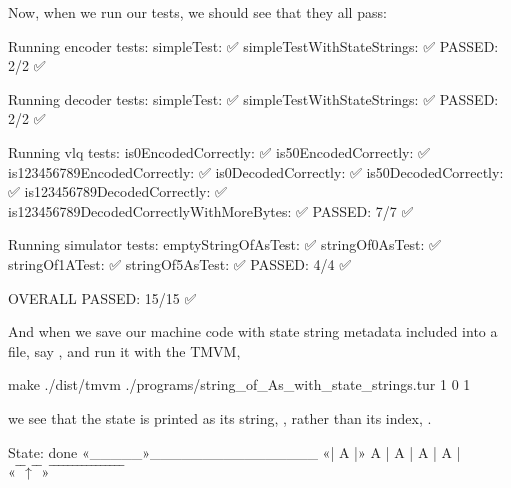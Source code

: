 Now, when we run our tests, we should see that they all pass:

\begin{stdout}
Running encoder tests:
  simpleTest: ✅
  simpleTestWithStateStrings: ✅
PASSED: 2/2 ✅

Running decoder tests:
  simpleTest: ✅
  simpleTestWithStateStrings: ✅
PASSED: 2/2 ✅

Running vlq tests:
  is0EncodedCorrectly: ✅
  is50EncodedCorrectly: ✅
  is123456789EncodedCorrectly: ✅
  is0DecodedCorrectly: ✅
  is50DecodedCorrectly: ✅
  is123456789DecodedCorrectly: ✅
  is123456789DecodedCorrectlyWithMoreBytes: ✅
PASSED: 7/7 ✅

Running simulator tests:
  emptyStringOfAsTest: ✅
  stringOf0AsTest: ✅
  stringOf1ATest: ✅
  stringOf5AsTest: ✅
PASSED: 4/4 ✅

OVERALL PASSED: 15/15 ✅
\end{stdout}

And when we save our machine code with state string metadata included into a file, say , and run it with the TMVM,

\begin{stdout}
make
./dist/tmvm ./programs/string_of_As_with_state_strings.tur 1 0 1
\end{stdout}

we see that the state is printed as its string, , rather than its index, .

\begin{stdout}
State: done
«_____»________________
«| A |» A | A | A | A |
«‾‾↑‾‾»‾‾‾‾‾‾‾‾‾‾‾‾‾‾‾‾
\end{stdout}